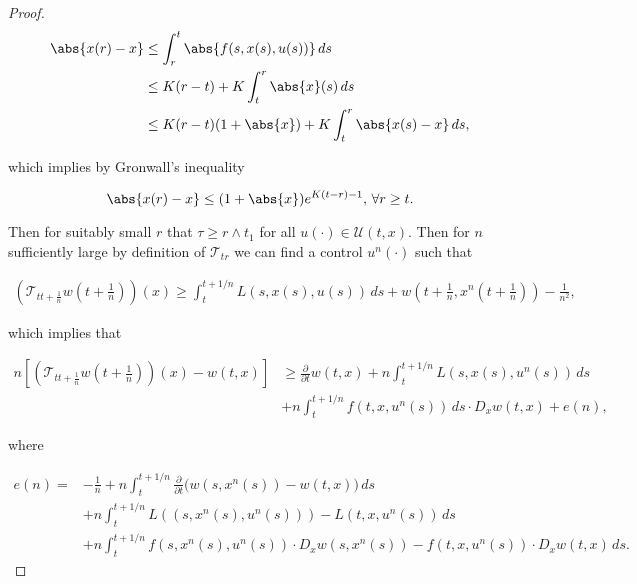 \begin{proof}
    \begin{align*}
        \abs{x(r)-x} & \leq \int_r^t \abs{f(s,x(s),u(s))} \,ds \\
        & \leq K(r-t) + K\int_t^r \abs{x}(s)\,ds \\
        & \leq K(r-t)(1+\abs{x}) + K\int_t^r \abs{x(s)-x}\,ds,
    \end{align*}

    which implies by Gronwall's inequality 

    \[\abs{x(r)-x} \leq (1+\abs{x})e^{K(t-r)-1},\,\forall r\geq t.\]

    Then for suitably small $r$ that $\tau\geq r\wedge t_1$ for all $u(\cdot)\in\mathcal{U}(t,x)$. Then for $n$ sufficiently large by definition of $\mathcal{T}_{tr}$ we can find a control $u^n(\cdot)$ such that
    
    \begin{align*}
        \left(\mathcal{T}_{tt+\frac{1}{n}}w\left(t+\frac{1}{n}\right)\right)(x) \geq \int_t^{t+1/n} L(s,x(s),u(s)) \,ds + w\left(t+\frac{1}{n},x^n\left(t+\frac{1}{n}\right)\right) - \frac{1}{n^2},
    \end{align*}

    which implies that 

    \begin{equation}\label{4-1-inproof:geq}
        \begin{aligned}
            n\left[\left(\mathcal{T}_{tt+\frac{1}{n}}w\left(t+\frac{1}{n}\right)\right)(x) - w(t,x)\right] & \geq \frac{\partial}{\partial t}w(t,x) + n\int_t^{t+1/n} L(s,x(s),u^n(s))\,ds \\ 
            & + n\int_t^{t+1/n} f(t,x,u^n(s))\,ds \cdot D_xw(t,x) + e(n),
        \end{aligned}        
    \end{equation}
    
    where 

    \begin{equation}
        \begin{aligned}
            e(n) = & -\frac{1}{n} +n\int_t^{t+1/n} \frac{\partial}{\partial t}\big(w(s,x^n(s)) - w(t,x)\big)\,ds \\
            & + n\int_t^{t+1/n} L((s,x^n(s),u^n(s))) - L(t,x,u^n(s))\,ds \\
            & + n\int_t^{t+1/n} f(s,x^n(s),u^n(s))\cdot D_xw(s,x^n(s)) - f(t,x,u^n(s))\cdot D_xw(t,x) \,ds.
        \end{aligned}
    \end{equation}


\end{proof}
